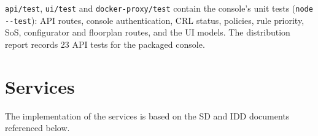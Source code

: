 \documentclass[a4paper]{arrowhead}
\begin{document}
\texttt{api/\allowbreak{}test}, \texttt{ui/\allowbreak{}test} and \texttt{docker-\allowbreak{}proxy/\allowbreak{}test} contain the console's unit tests (\texttt{node -\allowbreak{}-\allowbreak{}test}): API routes, console authentication, CRL status, policies, rule priority, SoS, configurator and floorplan routes, and the UI models. The distribution report records 23 API tests for the packaged console.

\newpage

\section{Services}
\label{sec:services}

The implementation of the services is based on the SD and IDD documents referenced below.
\end{document}
